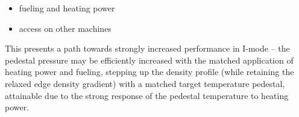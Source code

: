 \begin{itemize}
 \item fueling and heating power
 \item access on other machines
\end{itemize}

This presents a path towards strongly increased performance in I-mode -- the pedestal pressure may be efficiently increased with the matched application of heating power and fueling, stepping up the density profile (while retaining the relaxed edge density gradient) with a matched target temperature pedestal, attainable due to the strong response of the pedestal temperature to heating power.  

\nicechapterending


